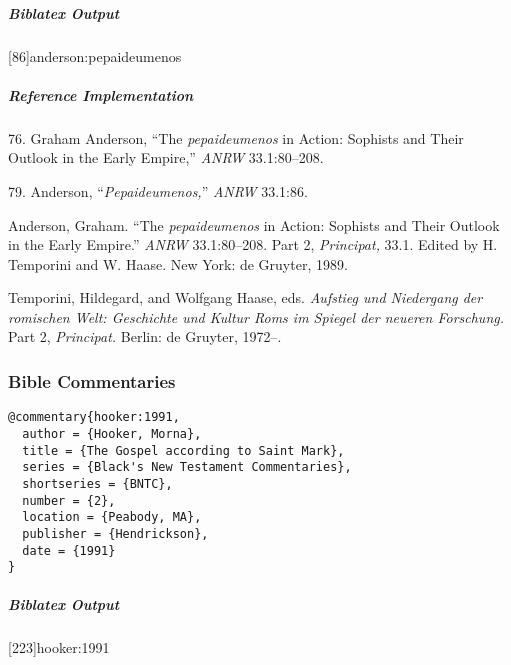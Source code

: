 \documentclass[a4paper]{article}
\newenvironment{biboutput}{%
  \subparagraph{Biblatex Output}
}{\color{black}}
\newenvironment{refimp}{%
  \subparagraph{Reference Implementation}
  \color{reference-colour}
  \rm
}{\par\color{black}}
\begin{document}
\begin{biboutput}
  [86]{anderson:pepaideumenos}
\end{biboutput}

\begin{refimp}
  \hspace*{\bibindent}76. Graham Anderson, “The \emph{pepaideumenos} in
  Action: Sophists and Their Outlook in the Early Empire,” \emph{ANRW}
  33.1:80–208.

  \hspace*{\bibindent}79. Anderson, “\emph{Pepaideumenos,}” \emph{ANRW}
  33.1:86.

  \hangindent\bibindent Anderson, Graham. “The \emph{pepaideumenos} in Action:
  Sophists and Their Outlook in the Early Empire.” \emph{ANRW} 33.1:80–208.
  Part 2, \emph{Principat,} 33.1. Edited by H. Temporini and W. Haase. New
  York: de Gruyter, 1989.

  \hangindent\bibindent Temporini, Hildegard, and Wolfgang Haase, eds.
  \emph{Aufstieg und Niedergang der romischen Welt: Geschichte und Kultur Roms
  im Spiegel der neueren Forschung.} Part 2, \emph{Principat.} Berlin: de
  Gruyter, 1972–.

\end{refimp}

\subsubsection{Bible Commentaries}

\begin{lstlisting}
@commentary{hooker:1991,
  author = {Hooker, Morna},
  title = {The Gospel according to Saint Mark},
  series = {Black's New Testament Commentaries},
  shortseries = {BNTC},
  number = {2},
  location = {Peabody, MA},
  publisher = {Hendrickson},
  date = {1991}
}
\end{lstlisting}  

\begin{biboutput}
  [223]{hooker:1991}
\end{biboutput}
\end{document}
